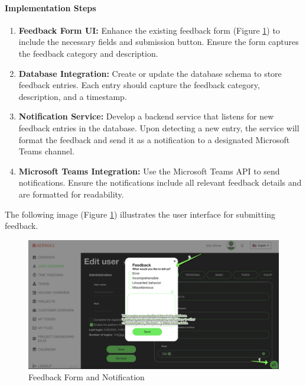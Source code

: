\paragraph{Implementation Steps}
\begin{enumerate}
    \item \textbf{Feedback Form UI:} Enhance the existing feedback form (Figure \ref{fig:feedback_form}) to include the necessary fields and submission button. Ensure the form captures the feedback category and description.
    \item \textbf{Database Integration:} Create or update the database schema to store feedback entries. Each entry should capture the feedback category, description, and a timestamp.
    \item \textbf{Notification Service:} Develop a backend service that listens for new feedback entries in the database. Upon detecting a new entry, the service will format the feedback and send it as a notification to a designated Microsoft Teams channel.
    \item \textbf{Microsoft Teams Integration:} Use the Microsoft Teams API to send notifications. Ensure the notifications include all relevant feedback details and are formatted for readability.
\end{enumerate}

The following image (Figure \ref{fig:feedback_form}) illustrates the user interface for submitting feedback.

\begin{figure}[H]
    \centering
    \includegraphics[width=1\textwidth]{src/assets/images/TeamsNotification.png}
    \caption{Feedback Form and Notification}
    \label{fig:feedback_form}
\end{figure}

